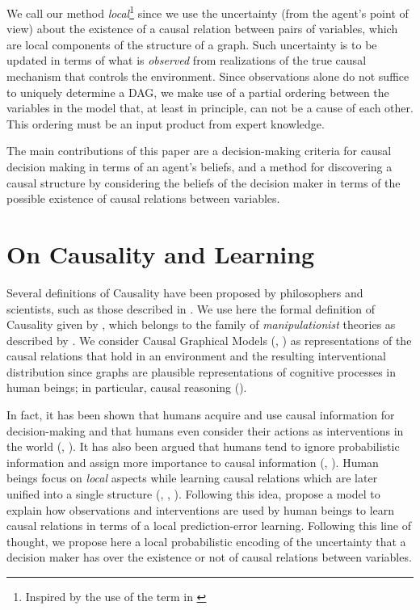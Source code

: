 \documentclass[letterpaper]{article}
\begin{document}
We call our method \textit{local}\footnote{Inspired by the use of the term in \cite{wellen2012learning}} since we use the uncertainty (from the agent's point of view) about the existence of a causal relation between pairs of variables, which are local components of the structure of a graph. Such uncertainty is to be updated in terms of what is \textit{observed} from realizations of the true causal mechanism that controls the environment. Since observations alone do not suffice to uniquely determine a DAG, we make use of a partial ordering between the variables in the model that, at least in principle, can not be a cause of each other. This ordering must be an input product from expert knowledge.

The main contributions of this paper are a decision-making criteria for causal decision making in terms of an agent's beliefs, and a method for discovering a causal structure by considering the beliefs of the decision maker in terms of the possible existence of causal relations between variables.

\section{On Causality and Learning}
Several definitions of Causality have been proposed by philosophers and scientists, such as those described in \cite{holland1986statistics}. We use here the formal definition of Causality given by \cite{spirtes2000causation}, which belongs to the family of \textit{manipulationist} theories as described by \cite{woodward2005making}. We consider Causal Graphical Models (\cite{koller2009probabilistic}, \cite{sucar2015probabilistic}) as representations of the causal relations that hold in an environment and the resulting interventional distribution since graphs are plausible representations of cognitive processes in human beings; in particular, causal reasoning (\cite{danks2014unifying}).

In fact, it has been shown that humans acquire and use causal information for decision-making and that humans even consider their actions as interventions in the world (\cite{hagmayer2009decision}, \cite{wellen2012learning} \cite{hagmayer2013repeated}). It has also been argued that humans tend to ignore probabilistic information and assign more importance to causal information (\cite{tversky1980causal}, \cite{pearl2009causality}). Human beings focus on \textit{local} aspects while learning causal relations which are later unified into a single structure (\cite{fernbach2009causal}, \cite{waldmann2008causal},  \cite{danks2014unifying}). Following this idea, \cite{wellen2012learning} propose a model to explain how observations  and interventions are used by human beings to learn causal relations in terms of a local prediction-error learning. Following this line of thought, we propose here a local probabilistic encoding of the uncertainty that a decision maker has over the existence or not of causal relations between variables.
\end{document}

